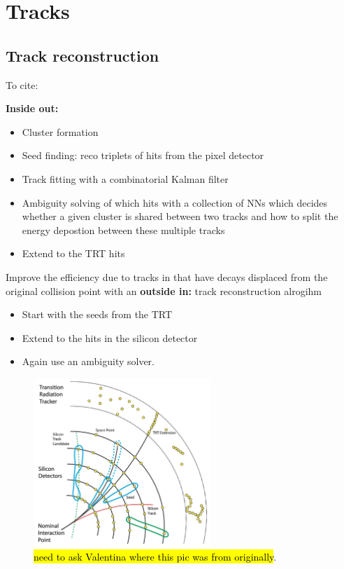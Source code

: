 \section{Tracks}
\label{sec:tracks}

\subsection{Track reconstruction}

To cite: \cite{soft-pub-2007-007}

\textbf{Inside out:}
\begin{itemize}
	\item Cluster formation
	\item Seed finding: reco triplets of hits from the pixel detector
	\item Track fitting with a combinatorial Kalman filter
	\item Ambiguity solving of which hits with a collection of NNs which decides whether a given cluster is shared between two tracks and how to split the energy depostion between these multiple tracks \cite{jinst-9-2014-P09009}
	\item Extend to the TRT hits
\end{itemize}

Improve the efficiency due to tracks in that have decays displaced from the original collision point with an \textbf{outside in:} track reconstruction alrogihm
\begin{itemize}
	\item Start with the seeds from the TRT
	\item Extend to the hits in the silicon detector
	\item Again use an ambiguity solver.
\end{itemize}

\begin{figure}[hbt]
\centering
\includegraphics[width=0.6\textwidth]{figures/cp-graphics/tracking/track-reco}
\caption{\hl{need to ask Valentina where this pic was from originally}.}
\label{fig:track-reco}
\end{figure}


